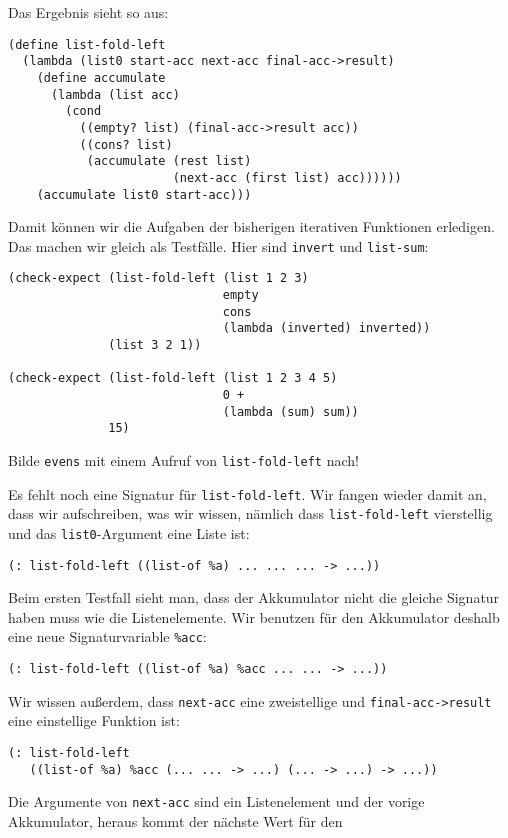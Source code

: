 Das Ergebnis sieht so aus:
%
\begin{lstlisting}
(define list-fold-left
  (lambda (list0 start-acc next-acc final-acc->result)
    (define accumulate
      (lambda (list acc)
        (cond
          ((empty? list) (final-acc->result acc))
          ((cons? list)
           (accumulate (rest list)
                       (next-acc (first list) acc))))))
    (accumulate list0 start-acc)))
\end{lstlisting}
%
Damit können wir die Aufgaben der bisherigen iterativen Funktionen
erledigen.  Das machen wir gleich als Testfälle.  Hier sind
\lstinline{invert} und \lstinline{list-sum}:
%
\begin{lstlisting}
(check-expect (list-fold-left (list 1 2 3)
                              empty
                              cons
                              (lambda (inverted) inverted))
              (list 3 2 1))

(check-expect (list-fold-left (list 1 2 3 4 5)
                              0 +
                              (lambda (sum) sum))
              15)
\end{lstlisting}
%
\begin{aufgabeinline}
  Bilde \lstinline{evens} mit einem Aufruf von
  \lstinline{list-fold-left} nach!
\end{aufgabeinline}
%
Es fehlt noch eine Signatur für \lstinline{list-fold-left}.  Wir
fangen wieder damit an, dass wir aufschreiben, was wir wissen, nämlich
dass \lstinline{list-fold-left} vierstellig und das
\lstinline{list0}-Argument eine Liste ist:
%
\begin{lstlisting}
(: list-fold-left ((list-of %a) ... ... ... -> ...))
\end{lstlisting}
%
Beim ersten Testfall sieht man, dass der Akkumulator nicht die gleiche
Signatur haben muss wie die Listenelemente.  Wir benutzen für
den Akkumulator deshalb eine neue Signaturvariable \lstinline{%acc}:
% 
\begin{lstlisting}
(: list-fold-left ((list-of %a) %acc ... ... -> ...))
\end{lstlisting}
%
Wir wissen außerdem, dass \lstinline{next-acc} eine zweistellige
und \lstinline{final-acc->result} eine einstellige Funktion ist:
%
\begin{lstlisting}
(: list-fold-left
   ((list-of %a) %acc (... ... -> ...) (... -> ...) -> ...))
\end{lstlisting}
%
Die Argumente von \lstinline{next-acc} sind ein Listenelement und der
vorige Akkumulator, heraus kommt der nächste Wert für den
